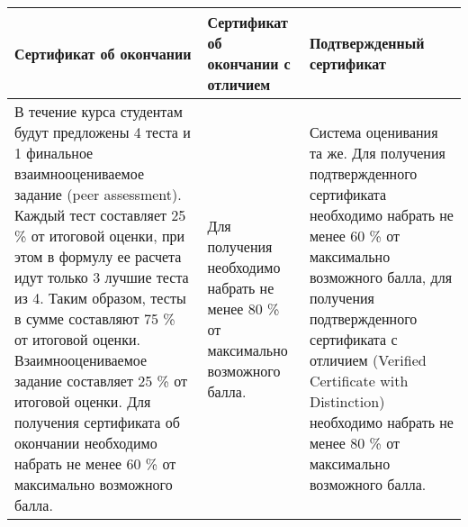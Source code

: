 \documentclass[a4paper,12pt]{article}
\begin{document}
\begin{center}
\begin{tabularx}{\textwidth}[left]{Y|X|Z}
 Сертификат об окончании & Сертификат об окончании с отличием & Подтвержденный сертификат  \\ 
\hline
\hline 
В течение курса студентам будут предложены 4 теста и 1 финальное взаимнооцениваемое задание (peer assessment). Каждый тест составляет 25 \% от итоговой оценки, при этом в формулу ее расчета идут только 3 лучшие теста из 4. Таким образом, тесты в сумме составляют 75 \% от итоговой оценки. Взаимнооцениваемое задание составляет 25 \% от итоговой оценки. Для получения сертификата об окончании необходимо набрать не менее 60 \% от максимально возможного балла. 
 & Для получения необходимо набрать не менее 80 \% от максимально возможного балла.
  & Система оценивания та же. Для получения подтвержденного сертификата необходимо набрать не менее 60 \% от максимально возможного балла, для получения подтвержденного сертификата с отличием (Verified Certificate with Distinction) необходимо набрать не менее 80 \% от максимально возможного балла. \\
\end{tabularx}
\end{center}
\end{document}
